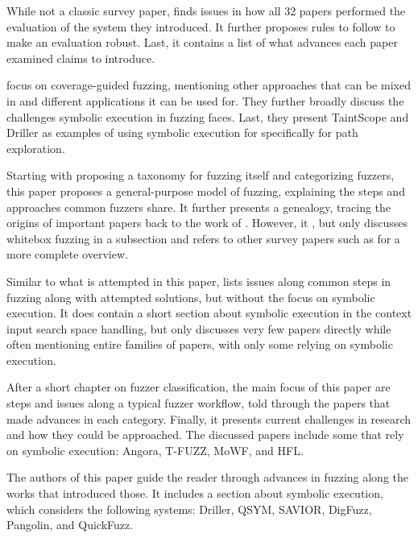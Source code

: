 \documentclass{article}
\begin{document}
\begin{multicols}{2}
    While not a classic survey paper,  finds issues in how all 32 papers performed the evaluation of the system they introduced. It further proposes rules to follow to make an evaluation robust. Last, it contains a list of what advances each paper examined claims to introduce.

    \citeauthor{FuzzingASurvey} focus on coverage-guided fuzzing, mentioning other approaches that can be mixed in and different applications it can be used for. They further broadly discuss the challenges symbolic execution in fuzzing faces. Last, they present TaintScope\cite{TaintScope} and Driller\cite{Driller} as examples of using symbolic execution for specifically for path exploration.

    Starting with proposing a taxonomy for fuzzing itself and categorizing fuzzers, this paper proposes a general-purpose model of fuzzing, explaining the steps and approaches common fuzzers share. It further presents a genealogy, tracing the origins of important papers back to the work of \citeauthor{UNIX}. However, it \cite{ArtScienceEng}, but only discusses whitebox fuzzing in a subsection and refers to other survey papers such as \cite{Orchestrated, AllYouEverWanted} for a more complete overview.

    Similar to what is attempted in this paper,  lists issues along common steps in fuzzing along with attempted solutions, but without the focus on symbolic execution. It does contain a short section about symbolic execution in the context input search space handling, but only discusses very few papers directly while often mentioning entire families of papers, with only some relying on symbolic execution.

    After a short chapter on fuzzer classification, the main focus of this paper are steps and issues along a typical fuzzer workflow, told through the papers that made advances in each category. Finally, it presents current challenges in research and how they could be approached. The discussed papers include some that rely on symbolic execution: Angora\cite{Angora}, T-FUZZ\cite{TFuzz}, MoWF\cite{MoWF}, and HFL\cite{HFL}.

    The authors of this paper guide the reader through advances in fuzzing along the works that introduced those. It includes a section about symbolic execution, which considers the following systems: Driller\cite{Driller}, QSYM\cite{QSYM}, SAVIOR\cite{SAVIOR}, DigFuzz\cite{DigFuzz}, Pangolin\cite{Pangolin}, and QuickFuzz\cite{QuickFuzz}.


\end{multicols}
\end{document}
